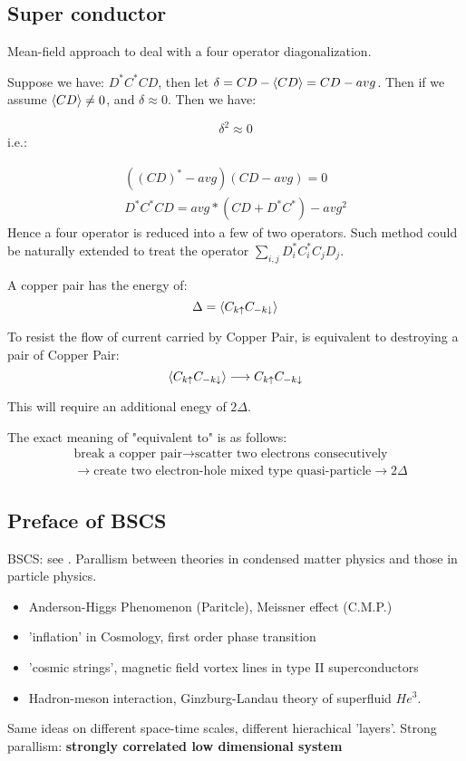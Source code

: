 \subsection{Super conductor}
Mean-field approach to deal with a four operator diagonalization.

Suppose we have: $D^*C^* CD$, then let $\delta = CD - \braket{CD} =
CD - avg$. Then if we assume $\braket{CD}\neq 0$, and $\delta \approx 0$. Then we have:

   	$$ \delta^2 \approx 0 $$
i.e.:

\begin{align}
   	( (CD)^* - avg ) ( CD - avg ) = 0\\
   	D^*C^*CD = avg*(CD+D^*C^*) - avg^2
\end{align}
Hence a four operator is reduced into a few of two operators.
Such method could be naturally extended to treat the operator
$\sum_{i,j} D^*_i C^*_i C_j D_j$.

A copper pair has the energy of:
$$\Delta = \braket{C_{k \uparrow}C_{-k \downarrow} }$$

To resist the flow of current carried by Copper Pair, is equivalent to destroying a pair of Copper Pair:
$$ \braket{C_{k \uparrow}C_{-k \downarrow} } \longrightarrow C_{k \uparrow}C_{-k \downarrow}$$

This will require an additional enegy of $2\Delta$.

The exact meaning of "equivalent to" is as follows:
\begin{align}
    & \text{break a copper pair} \longrightarrow 
    \text{scatter two electrons consecutively} 
    \nonumber\\ & \longrightarrow 
    \text{create two electron-hole mixed type quasi-particle} \longrightarrow 2\Delta \nonumber
\end{align}



\subsection{Preface of BSCS}
    \label{sec:Preface_of_Bosonization_and_Strongly 
    Correlated_Systems}
BSCS: see \cite{BSCS}.
Parallism between theories in condensed matter physics and those in
particle physics.
\begin{itemize}
        \item Anderson-Higgs Phenomenon (Paritcle), Meissner effect
                (C.M.P.)
        \item 'inflation' in Cosmology, first order phase transition
        \item 'cosmic strings', magnetic field vortex lines in type
                II superconductors
        \item Hadron-meson interaction, Ginzburg-Landau theory of
                superfluid $He^3$.
\end{itemize}
Same ideas on different space-time scales, different hierachical
'layers'.
Strong parallism: \textbf{strongly correlated low dimensional system}

